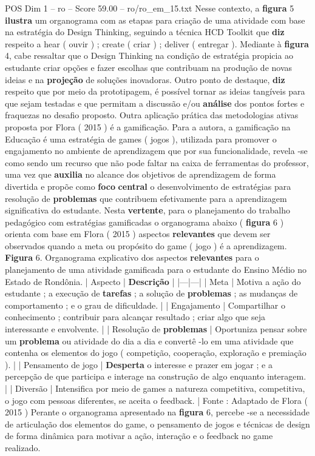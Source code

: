 \begin{textsample}{POS Dim 1 – ro – Score 59.00 – ro/ro\_em\_15.txt}
Nesse contexto, a \textbf{figura} 5 \textbf{ilustra} um organograma com as etapas para criação de uma atividade com base na estratégia do Design Thinking, seguindo a técnica HCD Toolkit que \textbf{diz} respeito a hear ( ouvir ) ; create ( criar ) ; deliver ( entregar ).
Mediante à \textbf{figura} 4, cabe ressaltar que o Design Thinking na condição de estratégia propicia ao estudante criar opções e fazer escolhas que contribuam na produção de novas ideias e na \textbf{projeção} de soluções inovadoras.
Outro ponto de destaque, \textbf{diz} respeito que por meio da prototipagem, é possível tornar as ideias tangíveis para que sejam testadas e que permitam a discussão e/ou \textbf{análise} dos pontos fortes e fraquezas no desafio proposto.
Outra aplicação prática das metodologias ativas proposta por Flora ( 2015 ) é a gamificação.
Para a autora, a gamificação na Educação é uma estratégia de games ( jogos ), utilizada para promover o engajamento no ambiente de aprendizagem que por sua funcionalidade, revela -se como sendo um recurso que não pode faltar na caixa de ferramentas do professor, uma vez que \textbf{auxilia} no alcance dos objetivos de aprendizagem de forma divertida e propõe como \textbf{foco} \textbf{central} o desenvolvimento de estratégias para resolução de \textbf{problemas} que contribuem efetivamente para a aprendizagem significativa do estudante.
Nesta \textbf{vertente}, para o planejamento do trabalho pedagógico com estratégias gamificadas o organograma abaixo ( \textbf{figura} 6 ) orienta com base em Flora ( 2015 ) aspectos \textbf{relevantes} que devem ser observados quando a meta ou propósito do game ( jogo ) é a aprendizagem. \textbf{Figura} 6.
Organograma explicativo dos aspectos \textbf{relevantes} para o planejamento de uma atividade gamificada para o estudante do Ensino Médio no Estado de Rondônia. | Aspecto | \textbf{Descrição} | |---|---| | Meta | Motiva a ação do estudante ; a execução de \textbf{tarefas} ; a solução de \textbf{problemas} ; as mudanças de comportamento ; e o grau de dificuldade. | | Engajamento | Compartilhar o conhecimento ; contribuir para alcançar resultado ; criar algo que seja interessante e envolvente. | | Resolução de \textbf{problemas} | Oportuniza pensar sobre um \textbf{problema} ou atividade do dia a dia e convertê -lo em uma atividade que contenha os elementos do jogo ( competição, cooperação, exploração e premiação ). | | Pensamento de jogo | \textbf{Desperta} o interesse e prazer em jogar ; e a percepção de que participa e interage na construção de algo enquanto interagem. | | Diversão | Intensifica por meio de games a natureza competitiva, competitiva, o jogo com pessoas diferentes, se aceita o feedback. | Fonte : Adaptado de Flora ( 2015 ) Perante o organograma apresentado na \textbf{figura} 6, percebe -se a necessidade de articulação dos elementos do game, o pensamento de jogos e técnicas de design de forma dinâmica para motivar a ação, interação e o feedback no game realizado.

\end{textsample}
